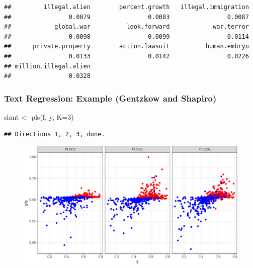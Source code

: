 \documentclass[
  shownotes,
  xcolor={svgnames},
  hyperref={colorlinks,citecolor=DarkBlue,linkcolor=DarkRed,urlcolor=DarkBlue}
  , aspectratio=169]{beamer}
\newenvironment{Shaded}{\begin{snugshade}}{\end{snugshade}}
\newcommand{\AttributeTok}[1]{\textcolor[rgb]{0.77,0.63,0.00}{#1}}
\newcommand{\DecValTok}[1]{\textcolor[rgb]{0.00,0.00,0.81}{#1}}
\newcommand{\FunctionTok}[1]{\textcolor[rgb]{0.00,0.00,0.00}{#1}}
\newcommand{\NormalTok}[1]{#1}
\newcommand{\OtherTok}[1]{\textcolor[rgb]{0.56,0.35,0.01}{#1}}
\begin{document}
\begin{frame}[fragile]
\begin{tiny}
\begin{verbatim}
##         illegal.alien        percent.growth   illegal.immigration 
##                0.0079                0.0083                0.0087 
##            global.war          look.forward            war.terror 
##                0.0098                0.0099                0.0114 
##      private.property        action.lawsuit          human.embryo 
##                0.0133                0.0142                0.0226 
## million.illegal.alien 
##                0.0328
\end{verbatim}


\end{tiny}

\end{frame}

\begin{frame}[fragile]
\frametitle{Text Regression: Example (Gentzkow and Shapiro)}

\begin{scriptsize}
\begin{Shaded}
\begin{Highlighting}[]

\NormalTok{slant }\OtherTok{\textless{}{-}} \FunctionTok{pls}\NormalTok{(f, y, }\AttributeTok{K=}\DecValTok{3}\NormalTok{)}
\end{Highlighting}
\end{Shaded}
\end{scriptsize}
\begin{tiny}
\begin{verbatim}
## Directions 1, 2, 3, done.
\end{verbatim}
\end{tiny}


  \begin{figure}[H] \centering
            \captionsetup{justification=centering}
              \includegraphics[scale=.5]{figures/pls.pdf}
 \end{figure}


\end{frame}
\end{document}
